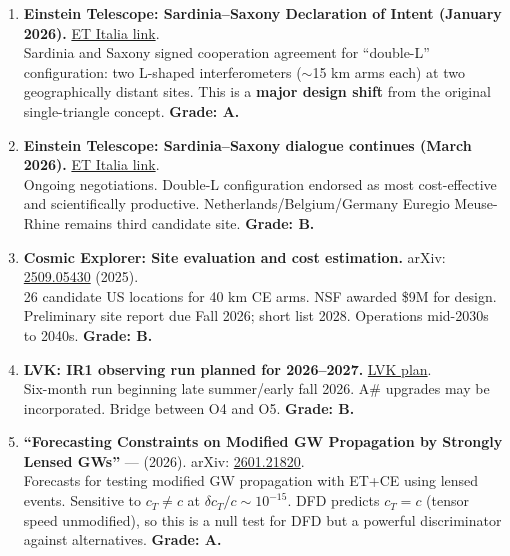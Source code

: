 \documentclass[11pt,a4paper]{article}
\begin{document}
\begin{enumerate}
\item \textbf{Einstein Telescope: Sardinia--Saxony Declaration of Intent (January 2026).} \href{https://www.einstein-telescope.it/en/2026/01/12/einstein-telescope-a-declaration-of-intent-between-sardinia-and-saxony-to-strengthen-scientific-cooperation-signed/}{ET Italia link}.\\
Sardinia and Saxony signed cooperation agreement for ``double-L'' configuration: two L-shaped interferometers ($\sim$15 km arms each) at two geographically distant sites. This is a \textbf{major design shift} from the original single-triangle concept. \textbf{Grade: A.}

\item \textbf{Einstein Telescope: Sardinia--Saxony dialogue continues (March 2026).} \href{https://www.einstein-telescope.it/en/2026/03/06/einstein-telescope-the-dialogue-between-italy-and-saxony-continues/}{ET Italia link}.\\
Ongoing negotiations. Double-L configuration endorsed as most cost-effective and scientifically productive. Netherlands/Belgium/Germany Euregio Meuse-Rhine remains third candidate site. \textbf{Grade: B.}

\item \textbf{Cosmic Explorer: Site evaluation and cost estimation.} arXiv: \href{https://arxiv.org/abs/2509.05430}{2509.05430} (2025).\\
26 candidate US locations for 40 km CE arms. NSF awarded \$9M for design. Preliminary site report due Fall 2026; short list 2028. Operations mid-2030s to 2040s. \textbf{Grade: B.}

\item \textbf{LVK: IR1 observing run planned for 2026--2027.} \href{https://observing.docs.ligo.org/plan/}{LVK plan}.\\
Six-month run beginning late summer/early fall 2026. A\# upgrades may be incorporated. Bridge between O4 and O5. \textbf{Grade: B.}

\item \textbf{``Forecasting Constraints on Modified GW Propagation by Strongly Lensed GWs''} --- (2026). arXiv: \href{https://arxiv.org/abs/2601.21820}{2601.21820}.\\
Forecasts for testing modified GW propagation with ET+CE using lensed events. Sensitive to $c_T \neq c$ at $\delta c_T / c \sim 10^{-15}$. DFD predicts $c_T = c$ (tensor speed unmodified), so this is a null test for DFD but a powerful discriminator against alternatives. \textbf{Grade: A.}
\end{enumerate}
\end{document}
